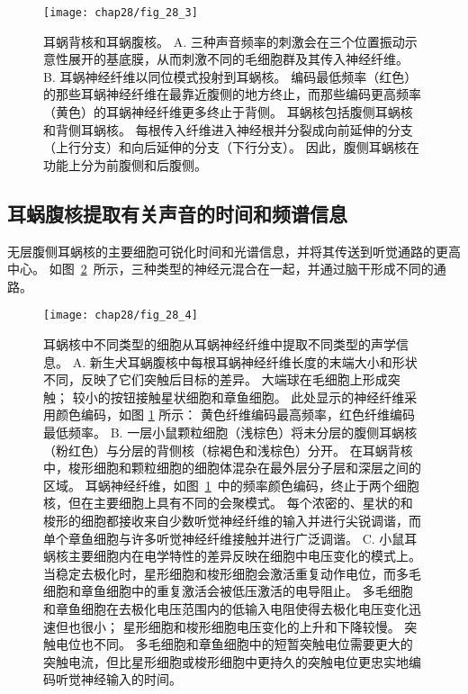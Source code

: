 \begin{figure}[htbp]
	\centering
	\texttt{[image: chap28/fig\_28\_3]}
	\caption{耳蜗背核和耳蜗腹核。
		A. 三种声音频率的刺激会在三个位置振动示意性展开的基底膜，从而刺激不同的毛细胞群及其传入神经纤维。
		B. 耳蜗神经纤维以同位模式投射到耳蜗核。
		编码最低频率（红色）的那些耳蜗神经纤维在最靠近腹侧的地方终止，而那些编码更高频率（黄色）的耳蜗神经纤维更多终止于背侧。
		耳蜗核包括腹侧耳蜗核和背侧耳蜗核。
		每根传入纤维进入神经根并分裂成向前延伸的分支（上行分支）和向后延伸的分支（下行分支）。
		因此，腹侧耳蜗核在功能上分为前腹侧和后腹侧。}
	\label{fig:28_3}
\end{figure}



\subsection{耳蜗腹核提取有关声音的时间和频谱信息}

无层腹侧耳蜗核的主要细胞可锐化时间和光谱信息，并将其传送到听觉通路的更高中心。 
如图~\ref{fig:28_4}~所示，三种类型的神经元混合在一起，并通过脑干形成不同的通路。


\begin{figure}[htbp]
	\centering
	\texttt{[image: chap28/fig\_28\_4]}
	\caption{耳蜗核中不同类型的细胞从耳蜗神经纤维中提取不同类型的声学信息。
		A. 新生犬耳蜗腹核中每根耳蜗神经纤维长度的末端大小和形状不同，反映了它们突触后目标的差异。 
		大端球在毛细胞上形成突触； 
		较小的按钮接触星状细胞和章鱼细胞。 
		此处显示的神经纤维采用颜色编码，如图 \ref{fig:28_3} 所示：
		黄色纤维编码最高频率，红色纤维编码最低频率\cite{y1909histologie}。
		B. 一层小鼠颗粒细胞（浅棕色）将未分层的腹侧耳蜗核（粉红色）与分层的背侧核（棕褐色和浅棕色）分开。 
		在耳蜗背核中，梭形细胞和颗粒细胞的细胞体混杂在最外层分子层和深层之间的区域。
		耳蜗神经纤维，如图~\ref{fig:28_3}~中的频率颜色编码，终止于两个细胞核，但在主要细胞上具有不同的会聚模式。
		每个浓密的、星状的和梭形的细胞都接收来自少数听觉神经纤维的输入并进行尖锐调谐，而单个章鱼细胞与许多听觉神经纤维接触并进行广泛调谐。
		C. 小鼠耳蜗核主要细胞内在电学特性的差异反映在细胞中电压变化的模式上。
		当稳定去极化时，星形细胞和梭形细胞会激活重复动作电位，而多毛细胞和章鱼细胞中的重复激活会被低压激活的电导阻止。
		多毛细胞和章鱼细胞在去极化电压范围内的低输入电阻使得去极化电压变化迅速但也很小； 
		星形细胞和梭形细胞电压变化的上升和下降较慢。
		突触电位也不同。
		多毛细胞和章鱼细胞中的短暂突触电位需要更大的突触电流，但比星形细胞或梭形细胞中更持久的突触电位更忠实地编码听觉神经输入的时间。}
	\label{fig:28_4}
\end{figure}


